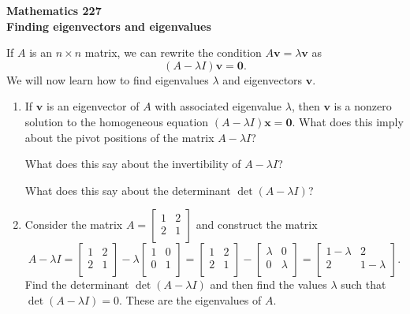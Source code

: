 \documentclass[12pt]{article}
\newcommand{\vs}[1]{\vspace{#1in}}
\newcommand{\vvec}{{\mathbf v}}
\newcommand{\xvec}{{\mathbf x}}
\newcommand{\zerovec}{{\mathbf 0}}
\begin{document}
\noindent
{\bf Mathematics 227} \\ 
{\bf Finding eigenvectors and eigenvalues}

\bigskip
If $A$ is an $n\times n$ matrix, we can rewrite the condition
$A\vvec = \lambda\vvec$ as
$$
(A-\lambda I)\vvec = \zerovec.
$$
We will now learn how to find eigenvalues $\lambda$ and eigenvectors
$\vvec$.   

\begin{enumerate}
\item If $\vvec$ is an eigenvector of $A$ with associated eigenvalue
  $\lambda$, then $\vvec$ is a nonzero solution to the homogeneous
  equation $(A-\lambda I)\xvec = \zerovec$.  What does this imply
  about the pivot positions of the matrix $A-\lambda I$?

  \vs{1}
  What does this say about the invertibility of $A-\lambda I$?

  \vs{1}
  What does this say about the determinant $\det(A-\lambda I)$?

  \vs{1}
\item Consider the matrix
  $A =
  \left[
    \begin{array}{cc}
      1 & 2 \\
      2 & 1 \\
    \end{array}
  \right]
  $ and construct the matrix
  $$
  A - \lambda I =
  \left[
    \begin{array}{cc}
      1 & 2 \\
      2 & 1 \\
    \end{array}
  \right]
  -\lambda
  \left[
    \begin{array}{cc}
      1 & 0 \\
      0 & 1 \\
    \end{array}
  \right]
  =
  \left[
    \begin{array}{cc}
      1 & 2 \\
      2 & 1 \\
    \end{array}
  \right]
  -
  \left[
    \begin{array}{cc}
      \lambda & 0 \\
      0 & \lambda \\
    \end{array}
  \right]
  =
  \left[
    \begin{array}{cc}
      1-\lambda & 2 \\
      2 & 1-\lambda \\
    \end{array}
  \right].
  $$
  Find the determinant $\det(A-\lambda I)$ and then find the values
  $\lambda$ such that $\det(A-\lambda I) = 0$.  These are the
  eigenvalues of $A$.


\end{enumerate}
\end{document}
